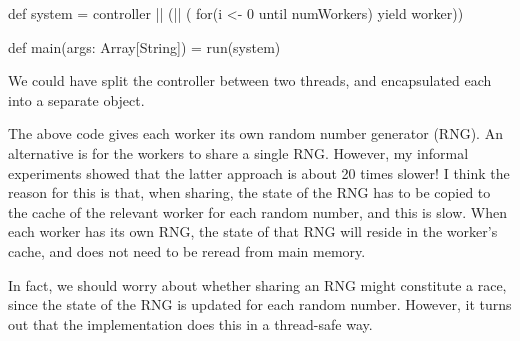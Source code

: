 \begin{answerS}
\begin{scala}
{  def system = controller || (|| ( for(i <- 0 until numWorkers) yield worker))

  def main(args: Array[String]) = run(system)
}
\end{scala}

We could have split the controller between two threads, and encapsulated each
into a separate object.

The above code gives each worker its own random number generator (RNG).  An
alternative is for the workers to share a single RNG.  However, my informal
experiments showed that the latter approach is about 20 times slower!  I think
the reason for this is that, when sharing, the state of the RNG has to be
copied to the cache of the relevant worker for each random number, and this is
slow.  When each worker has its own RNG, the state of that RNG will reside in
the worker's cache, and does not need to be reread from main memory.  

In fact, we should worry about whether sharing an RNG might constitute a race,
since the state of the RNG is updated for each random number.  However, it
turns out that the implementation does this in a thread-safe way.
\end{answerS}



